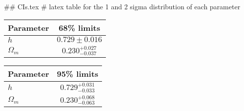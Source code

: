 ## CIs.tex
# latex table for the 1 and 2 sigma distribution of each parameter

\begin{tabular} { l  c}
 Parameter &  68\% limits\\
\hline
{\boldmath$h              $} & $0.729\pm 0.016            $\\
{\boldmath$\Omega_m       $} & $0.230^{+0.027}_{-0.037}   $\\
\hline
\end{tabular}

\begin{tabular} { l  c}
 Parameter &  95\% limits\\
\hline
{\boldmath$h              $} & $0.729^{+0.031}_{-0.033}   $\\
{\boldmath$\Omega_m       $} & $0.230^{+0.068}_{-0.063}   $\\
\hline
\end{tabular}
